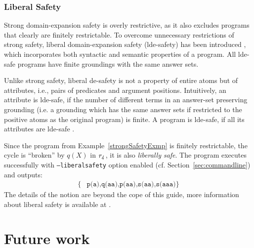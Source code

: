 \documentclass[a4paper, titlepage]{article}
\newcommand{\row}[1]{%
  \ensuremath{\it \color{black} #1 \color{black}}%
}
\begin{document}
\subsubsection{Liberal Safety}
Strong domain-expansion safety is overly restrictive, as it also excludes programs that clearly are finitely
restrictable. To overcome unnecessary restrictions of strong safety, liberal domain-expansion safety (lde-safety)
has been introduced \cite{eite-etal-14a}, which incorporates both syntactic and semantic properties of a program. All lde-safe programs have finite groundings with the same answer sets.

Unlike strong safety, liberal de-safety is not a property of entire atoms but of attributes, i.e., pairs of
predicates and argument positions. Intuitively, an attribute is lde-safe, if the number of different terms in
an answer-set preserving grounding (i.e. a grounding which has the same answer sets if restricted to the
positive atoms as the original program) is finite. A program is lde-safe, if all its attributes are lde-safe \cite{efikrs2015}.

Since the program from Example~\ref{strongSafetyExmp} is finitely restrictable, the cycle is “broken” by $\mathit{q(X)}$ in $\row{r_4}$, it is also \emph{liberally safe}. The program executes successfully with \texttt{--liberalsafety} option enabled (cf. Section~\ref{sec:commandline}) and outputs:
\begin{align*}
\{ & 
\texttt{p(a),q(aa),p(aa),s(aa),s(aaa)}
\}
\end{align*}
The details of the notion are beyond the cope of this guide, more information about liberal safety is available at \cite{eite-etal-14a}.



\section{Future work}
\label{sec:future}
\newpage


\end{document}
